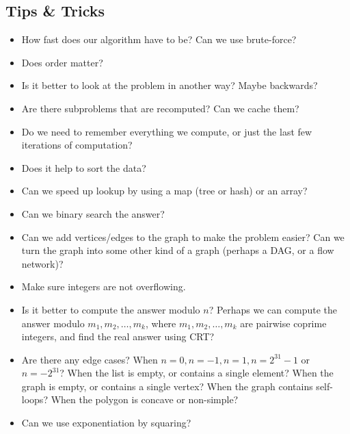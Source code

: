 \documentclass[11pt,a4paper,titlepage]{article}
\begin{document}
		\subsection{Tips \&{} Tricks}
			\begin{itemize}
				\item How fast does our algorithm have to be? Can we use brute-force?
				\item Does order matter?
				\item Is it better to look at the problem in another way? Maybe backwards?
				\item Are there subproblems that are recomputed? Can we cache them?
				\item Do we need to remember everything we compute, or just the last few iterations of computation?
				\item Does it help to sort the data?
				\item Can we speed up lookup by using a map (tree or hash) or an array?
				\item Can we binary search the answer?
				\item Can we add vertices/edges to the graph to make the problem easier? Can we turn the graph into some other kind of a graph (perhaps a DAG, or a flow network)?
				\item Make sure integers are not overflowing.
				\item Is it better to compute the answer modulo $n$? Perhaps we can compute the answer modulo $m_1,m_2,\ldots,m_k$, where $m_1,m_2,\ldots,m_k$ are pairwise coprime integers, and find the real answer using CRT?
				\item Are there any edge cases? When $n=0, n=-1, n=1, n=2^{31}-1$ or $n=-2^{31}$? When the list is empty, or contains a single element? When the graph is empty, or contains a single vertex? When the graph contains self-loops?  When the polygon is concave or non-simple?
				\item Can we use exponentiation by squaring?
			\end{itemize}
\end{document}
